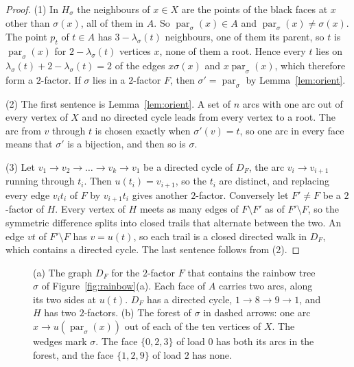 \documentclass[10pt]{amsart}
\numberwithin{equation}{section}
\theoremstyle{definition}
\theoremstyle{remark}
\newcommand{\parent}{\operatorname{par}}
\begin{document}
\begin{proof}
(1) In $H_\sigma$ the neighbours of $x\in X$ are the points of the black faces at $x$ other than $\sigma(x)$, all of them in $A$.
So $\parent_\sigma(x)\in A$ and $\parent_\sigma(x)\ne\sigma(x)$.
The point $p_t$ of $t\in A$ has $3-\lambda_\sigma(t)$ neighbours, one of them its parent, so $t$ is $\parent_\sigma(x)$ for $2-\lambda_\sigma(t)$ vertices $x$, none of them a root.
Hence every $t$ lies on $\lambda_\sigma(t)+2-\lambda_\sigma(t)=2$ of the edges $x\sigma(x)$ and $x\parent_\sigma(x)$, which therefore form a $2$-factor.
If $\sigma$ lies in a $2$-factor $F$, then $\sigma'=\parent_\sigma$ by Lemma~\ref{lem:orient}.

(2) The first sentence is Lemma~\ref{lem:orient}. A set of $n$ arcs with one arc out of every vertex of $X$ and no directed cycle leads from every vertex to a root. The arc from $v$ through $t$ is chosen exactly when $\sigma'(v)=t$, so one arc in every face means that $\sigma'$ is a bijection, and then so is $\sigma$.

(3) Let $v_1\to v_2\to\dots\to v_k\to v_1$ be a directed cycle of $D_F$, the arc $v_i\to v_{i+1}$ running through $t_i$.
Then $u(t_i)=v_{i+1}$, so the $t_i$ are distinct, and replacing every edge $v_it_i$ of $F$ by $v_{i+1}t_i$ gives another $2$-factor.
Conversely let $F'\ne F$ be a $2$-factor of $H$.
Every vertex of $H$ meets as many edges of $F\setminus F'$ as of $F'\setminus F$, so the symmetric difference splits into closed trails that alternate between the two.
An edge $vt$ of $F'\setminus F$ has $v=u(t)$, so each trail is a closed directed walk in $D_F$, which contains a directed cycle.
The last sentence follows from (2).
\end{proof}

\begin{figure}[H]
\centering
\scalebox{.9}{\begin{minipage}{\textwidth}\centering\end{minipage}}
\caption{(a) The graph $D_F$ for the $2$-factor $F$ that contains the rainbow tree $\sigma$ of Figure~\ref{fig:rainbow}(a). Each face of $A$ carries two arcs, along its two sides at $u(t)$. $D_F$ has a directed cycle, $1\to8\to9\to1$, and $H$ has two $2$-factors. (b) The forest of $\sigma$ in dashed arrows: one arc $x\to u(\parent_\sigma(x))$ out of each of the ten vertices of $X$. The wedges mark $\sigma$. The face $\{0,2,3\}$ of load $0$ has both its arcs in the forest, and the face $\{1,2,9\}$ of load $2$ has none.}
\label{fig:digraph}
\end{figure}
\end{document}
